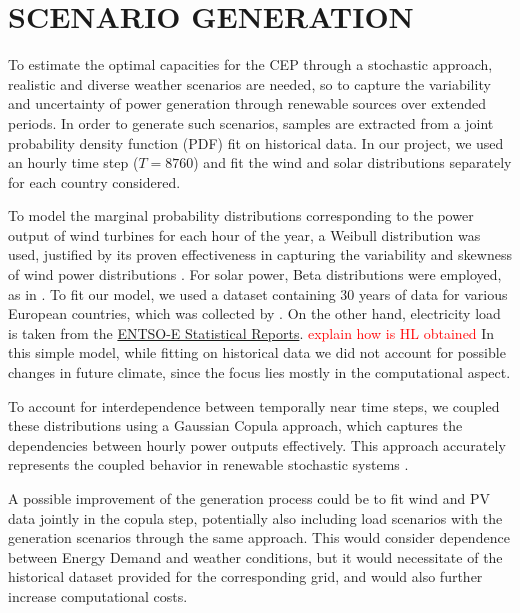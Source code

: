{\newpage
\color{black}

\appendix

\section{SCENARIO GENERATION}\label{generation}

To estimate the optimal capacities for the CEP through a stochastic approach, realistic and diverse weather scenarios are needed, so to capture the variability and uncertainty of power generation through renewable sources over extended periods. 
In order to generate such scenarios, samples are extracted from a joint probability density function (PDF) fit on historical data. 
In our project, we used an hourly time step ($T=8760$) and fit the wind and solar distributions separately for each country considered.

To model the marginal probability distributions corresponding to the power output of wind turbines for each hour of the year, a Weibull distribution was used, justified by its proven effectiveness in capturing the variability and skewness of wind power distributions \textcolor{green}{\cite{weibullwind}}. 
For solar power, Beta distributions were employed, as in \textcolor{green}{\cite{betaPV}}.
To fit our model, we used a dataset containing 30 years of data for various European countries, which was collected by \textcolor{green}{\cite{30y_gen}}. 
On the other hand, electricity load is taken from the \textcolor{green}{\href{https://www.entsoe.eu/data/power-stats/}{ENTSO-E Statistical Reports}}. \textcolor{red}{explain how is HL obtained}
In this simple model, while fitting on historical data we did not account for possible changes in future climate, since the focus lies mostly in the computational aspect.

To account for interdependence between temporally near time steps, we coupled these distributions using a Gaussian Copula approach, which captures the dependencies between hourly power outputs effectively. 
This approach accurately represents the coupled behavior in renewable stochastic systems \textcolor{green}{\cite{GaussCopula}}. 

A possible improvement of the generation process could be to fit wind and PV data jointly in the copula step, potentially also including load scenarios with the generation scenarios through the same approach. 
This would consider dependence between Energy Demand and weather conditions, but it would necessitate of the historical dataset provided for the corresponding grid, and would also further increase computational costs.

}
